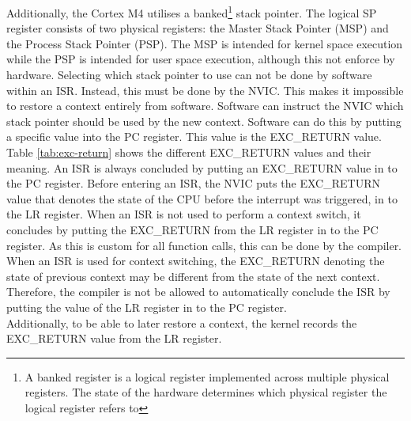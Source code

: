 Additionally, the Cortex M4 utilises a banked\footnote{A banked register is a
logical register implemented across multiple physical registers. The state of
the hardware determines which physical register the logical register refers to\cite{register_banking}} stack pointer.
The logical SP register consists of two physical registers: the Master Stack
Pointer (MSP) and the Process Stack Pointer (PSP).
The MSP is intended for kernel space execution while the PSP is intended for
user space execution, although this not enforce by hardware.
Selecting which stack pointer to use can not be done by software within an ISR.
Instead, this must be done by the NVIC. This makes it impossible to restore a
context entirely from software. Software can instruct the NVIC which stack
pointer should be used by the new context. Software can do this by putting a
specific value into the PC register. This value is the EXC\_RETURN value. Table
\ref{tab:exc-return} shows the different EXC\_RETURN values and their meaning.
An ISR is always concluded by putting an EXC\_RETURN value in to the PC register.
Before entering an ISR, the NVIC puts the EXC\_RETURN value that denotes the
state of the CPU before the interrupt was triggered, in to the LR register.
When an ISR is not used to perform a context switch, it concludes by putting
the EXC\_RETURN from the LR register in to the PC register. As this is custom
for all function calls, this can be done by the compiler.
When an ISR is used for context switching, the EXC\_RETURN denoting the state of
previous context may be different from the state of the next context. Therefore,
the compiler is not be allowed to automatically conclude the ISR by putting
the value of the LR register in to the PC register.\\
Additionally, to be able to later restore a context, the kernel records the
EXC\_RETURN value from the LR register.

